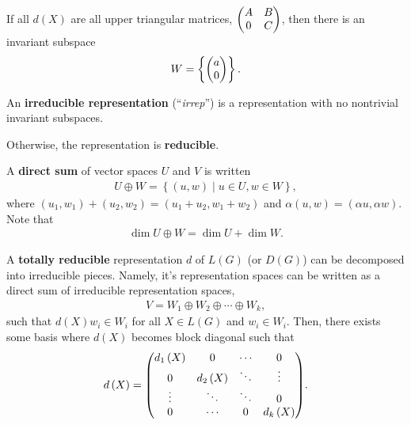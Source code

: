 \begin{example}
    If all $d\left( X \right)$ are all upper triangular matrices, $\mqty( A & B \\ 0 & C )$, then there is an invariant subspace
    \begin{align}
        W = \left\{\mqty( a \\ 0 )\right\} 
    .\end{align}
\end{example}

\begin{definition}
    An \textbf{irreducible representation} (``\textit{irrep}'') is a representation with no nontrivial invariant subspaces.

    Otherwise, the representation is \textbf{reducible}.
\end{definition}

\begin{definition}
    A \textbf{direct sum} of vector spaces $U$ and $V$ is written
    \begin{align}
        U \oplus W =  \left\{\left( u,w \right)  \mid u \in U, w \in W \right\} 
    ,\end{align}
    where $\left( u_1, w_1 \right)  + \left( u_2, w_2 \right) = \left( u_1 + u_2, w_1 + w_2 \right) $ and $\alpha \left( u, w \right) = \left( \alpha u, \alpha w \right) $. Note that
    \begin{align}
        \dim U \oplus W = \dim U + \dim W
    .\end{align}
\end{definition}

\begin{definition}
    A \textbf{totally reducible} representation $d$ of $L\left( G \right) $ (or $D \left( G \right) $) can be decomposed into irreducible pieces. Namely, it's representation spaces can be written as a direct sum of irreducible representation spaces,
    \begin{align}
        V = W_1 \oplus W_2 \oplus \cdots \oplus W_k
    ,\end{align}
    such that $d \left( X \right) w_i \in W_i$ for all $X \in L \left( G \right)$ and $w_i \in W_i$. Then, there exists some basis where $d \left( X \right) $ becomes block diagonal such that
    \begin{align}
        d \left( X \right) = \mqty( d_1 \left( X \right) & 0 & \cdots & 0 \\
        0 & d_2 \left( X \right) & \ddots & \vdots \\
        \vdots & \ddots & \ddots & 0 \\
        0 & \cdots & 0 & d_k\left( X \right)  )
    .\end{align}
\end{definition}

